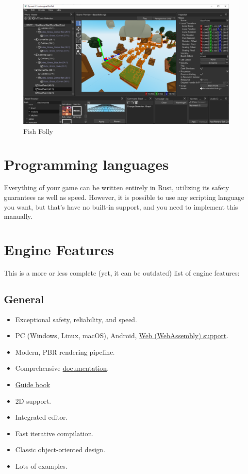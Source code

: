 \documentclass[
]{book}
\providecommand{\tightlist}{%
  \setlength{\itemsep}{0pt}\setlength{\parskip}{0pt}}
\theoremstyle{definition}
\theoremstyle{definition}
\theoremstyle{definition}
\theoremstyle{definition}
\theoremstyle{remark}
\begin{document}
\begin{figure}
\centering
\includegraphics{images/editor.png}
\caption{Fish Folly}
\end{figure}

\section{Programming languages}\label{programming-languages}

Everything of your game can be written entirely in Rust, utilizing its safety guarantees as well as speed. However, it is possible to use any scripting language you want, but that's have no built-in support, and you need to implement this manually.

\section{Engine Features}\label{engine-features}

This is a more or less complete (yet, it can be outdated) list of engine features:

\subsection{General}\label{general}

\begin{itemize}
\tightlist
\item
  Exceptional safety, reliability, and speed.
\item
  PC (Windows, Linux, macOS), Android, \href{https://fyrox.rs/examples}{Web (WebAssembly) support}.
\item
  Modern, PBR rendering pipeline.
\item
  Comprehensive \href{https://docs.rs/Fyrox}{documentation}.
\item
  \href{https://fyrox-book.github.io}{Guide book}
\item
  2D support.
\item
  Integrated editor.
\item
  Fast iterative compilation.
\item
  Classic object-oriented design.
\item
  Lots of examples.
\end{itemize}
\end{document}
